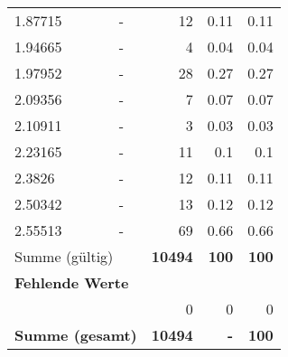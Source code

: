 \begin{longtable}{lXrrr}
        1.87715 & \multicolumn{1}{X}{-} & %
          \num{12} &
          \num[round-mode=places,round-precision=2]{0,11} &
          \num[round-mode=places,round-precision=2]{0,11} \\

        1.94665 & \multicolumn{1}{X}{-} & %
          \num{4} &
          \num[round-mode=places,round-precision=2]{0,04} &
          \num[round-mode=places,round-precision=2]{0,04} \\

        1.97952 & \multicolumn{1}{X}{-} & %
          \num{28} &
          \num[round-mode=places,round-precision=2]{0,27} &
          \num[round-mode=places,round-precision=2]{0,27} \\

        2.09356 & \multicolumn{1}{X}{-} & %
          \num{7} &
          \num[round-mode=places,round-precision=2]{0,07} &
          \num[round-mode=places,round-precision=2]{0,07} \\

        2.10911 & \multicolumn{1}{X}{-} & %
          \num{3} &
          \num[round-mode=places,round-precision=2]{0,03} &
          \num[round-mode=places,round-precision=2]{0,03} \\

        2.23165 & \multicolumn{1}{X}{-} & %
          \num{11} &
          \num[round-mode=places,round-precision=2]{0,1} &
          \num[round-mode=places,round-precision=2]{0,1} \\

        2.3826 & \multicolumn{1}{X}{-} & %
          \num{12} &
          \num[round-mode=places,round-precision=2]{0,11} &
          \num[round-mode=places,round-precision=2]{0,11} \\

        2.50342 & \multicolumn{1}{X}{-} & %
          \num{13} &
          \num[round-mode=places,round-precision=2]{0,12} &
          \num[round-mode=places,round-precision=2]{0,12} \\

        2.55513 & \multicolumn{1}{X}{-} & %
          \num{69} &
          \num[round-mode=places,round-precision=2]{0,66} &
          \num[round-mode=places,round-precision=2]{0,66} \\

     \midrule
     \multicolumn{2}{l}{Summe (gültig)} &
       \textbf{\num{10494}} &
     \textbf{100} &
       \textbf{\num[round-mode=places,round-precision=2]{100}} \\
     \multicolumn{5}{l}{\textbf{Fehlende Werte}}\\
      & & 0 & 0 & 0 \\
     \midrule
     \multicolumn{2}{l}{\textbf{Summe (gesamt)}} &
          \textbf{\num{10494}} &
        \textbf{-} &
        \textbf{100} \\
     \bottomrule
     \end{longtable}
     
